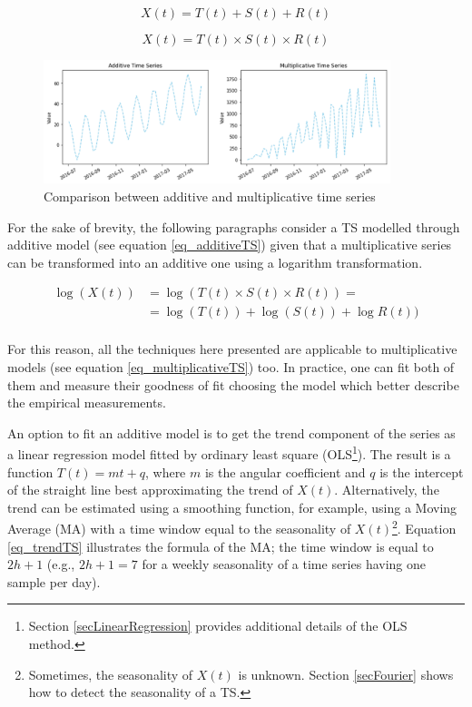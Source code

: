 \begin{equation}
X\left(t\right)=T\left(t\right)+S\left(t\right)+R(t)
\label{eq_additiveTS}
\end{equation}

\begin{equation}
X\left(t\right)=T\left(t\right)\times S\left(t\right)\times R(t)
\label{eq_multiplicativeTS}
\end{equation}

\begin{figure}[hbt!]
\centering
\includegraphics[width=0.9\textwidth]{SectionLetsMath/elemStat_figures/fig_addMulTS.png}
\captionsetup{type=figure}
\caption{Comparison between additive and multiplicative time series}
\label{fig_addMulTS}
\end{figure}

For the sake of brevity, the following paragraphs consider a TS modelled through additive model (see equation \ref{eq_additiveTS}) given that a multiplicative series can be transformed into an additive one using a logarithm transformation.

\begin{equation}
\begin{split}
    \log{\left(X\left(t\right)\right)} & =\log{\left(T\left(t\right)\times S\left(t\right)\times R\left(t\right)\right)}=\\
    & =\log{(T(t))+\log{(S(t))+\log{R(t))}}}\\
\end{split}
\label{eq_additiveMultiplicativeTransform}
\end{equation}

For this reason, all the techniques here presented are applicable to multiplicative models (see equation \ref{eq_multiplicativeTS}) too. In practice, one can fit both of them and measure their goodness of fit choosing the model which better describe the empirical measurements. 

An option to fit an additive model is to get the trend component of the series as a linear regression model fitted by ordinary least square (OLS\footnote{Section \ref{secLinearRegression} provides additional details of the OLS method.}). The result is a function $T\left(t\right)=mt+q$, where $m$ is the angular coefficient and $q$ is the intercept of the straight line best approximating the trend of $X(t)$. Alternatively, the trend can be estimated using a smoothing function, for example, using a Moving Average (MA) with a time window equal to the seasonality of $X(t)$\footnote{Sometimes, the seasonality of $X(t)$ is unknown. Section \ref{secFourier} shows how to detect the seasonality of a TS.}. Equation \ref{eq_trendTS} illustrates the formula of the MA; the time window is equal to $2h+1$ (e.g., $2h+1=7$ for a weekly seasonality of a time series having one sample per day).

